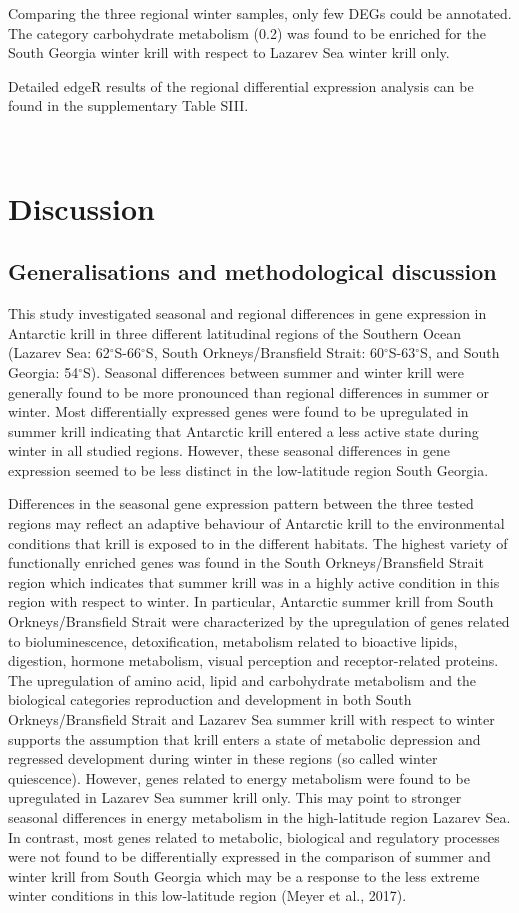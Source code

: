 Comparing the three regional winter samples, only few DEGs could be annotated.
The category  carbohydrate metabolism (0.2) was found to be enriched for the
South Georgia winter krill with respect to Lazarev Sea winter krill only. 

Detailed edgeR results of the regional differential expression analysis can be
found in the supplementary Table SIII.

 
\section{Discussion}

\subsection*{Generalisations and methodological discussion}

This study investigated seasonal and regional differences in gene expression in
Antarctic krill in three different latitudinal regions of the Southern Ocean
(Lazarev Sea: 62$^{\circ}$S-66$^{\circ}$S, South Orkneys/Bransfield Strait:
60$^{\circ}$S-63$^{\circ}$S, and South Georgia: 54$^{\circ}$S). Seasonal
differences between summer and winter krill were generally found to be more
pronounced than regional differences in summer or winter. Most differentially
expressed genes were found to be upregulated in summer krill indicating that
Antarctic krill entered a less active state during winter in all studied
regions. However, these seasonal differences in gene expression seemed to be
less distinct in the low-latitude region South Georgia.

Differences in the seasonal gene expression pattern between the three tested
regions may reflect an adaptive behaviour of Antarctic krill to the
environmental conditions that krill is exposed to in the different habitats.
The highest variety of functionally enriched genes was found in the South
Orkneys/Bransfield Strait region which indicates that summer krill was in a
highly active condition in this region with respect to winter. In particular,
Antarctic summer krill from South Orkneys/Bransfield Strait were characterized
by the upregulation of genes related to bioluminescence, detoxification,
metabolism related to bioactive lipids, digestion, hormone metabolism, visual
perception and receptor-related proteins. The upregulation of amino acid, lipid
and carbohydrate metabolism and the biological categories reproduction and
development in both South Orkneys/Bransfield Strait and Lazarev Sea summer
krill with respect to winter supports the assumption that krill enters a state
of metabolic depression and regressed development during winter in these
regions (so called winter quiescence). However, genes related to energy
metabolism were found to be upregulated in Lazarev Sea summer krill only. This
may point to stronger seasonal differences in energy metabolism in the
high-latitude region Lazarev Sea. In contrast, most genes related to metabolic,
biological and regulatory processes were not found to be differentially
expressed in the comparison of summer and winter krill from South Georgia which
may be a response to the less extreme winter conditions in this low-latitude
region (Meyer et al., 2017).

